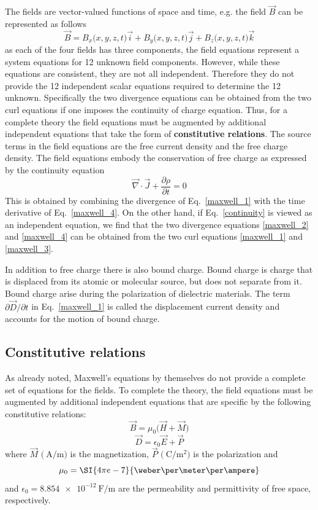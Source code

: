 \documentclass[12pt,a4paper,oneside]{book}
\begin{document}
\begin{onehalfspace}
The fields are vector-valued functions of space and time, e.g. the field $\vec{B}$ can be represented as follows $$ \vec{B} = B_x\big(x,y,z,t\big)\vec{i}+B_y\big(x,y,z,t\big)\vec{j}+B_z\big(x,y,z,t\big)\vec{k}$$ as each of the four fields has three components, the field equations represent a system equations for 12 unknown field components. However, while these equations are consistent, they are not all independent. Therefore they do not provide the 12 independent scalar equations required to determine the 12 unknown. Specifically the two divergence equations can be obtained from the two curl equations if one imposes the continuity of charge equation. Thus, for a complete theory the field equations must be augmented by additional independent equations that take the form of \textbf{constitutive relations}. The source terms in the field equations are the free current density and the free charge density. The field equations embody the conservation of free charge as expressed by the continuity equation
\begin{equation}\label{continuity}
	\vec{\nabla}\cdot\vec{J}+\frac{\partial \rho}{\partial t}=0
\end{equation}
This is obtained by combining the divergence of Eq.~\eqref{maxwell_1} with the time derivative of Eq.~\eqref{maxwell_4}. On the other hand, if Eq.~\eqref{continuity} is viewed as an independent equation, we find that the two divergence equations \ref{maxwell_2} and \ref{maxwell_4} can be obtained from the two curl equations \ref{maxwell_1} and \ref{maxwell_3}.

In addition to free charge there is also bound charge. Bound charge is charge that is displaced from its atomic or molecular source, but does not separate from it. Bound charge arise during the polarization of dielectric materials. The term $\partial\vec{D}/\partial t$ in Eq.~\eqref{maxwell_1} is called the displacement current density and accounts for the motion of bound charge.
\subsection{Constitutive relations}
As already noted, Maxwell's equations by themselves do not provide a complete set of equations for the fields. To complete the theory, the field equations must be augmented by additional independent equations that are specific by the following constitutive relations:
\begin{equation}\label{constitutive_1}
	\vec{B}=\mu_0\Big(\vec{H}+\vec{M}\Big)
\end{equation}
\begin{equation}\label{constitutive_2}
	\vec{D}=\epsilon_0\vec{E}+\vec{P}
\end{equation}
where $\vec{M}$ $\big(\SI{}{\ampere\per\meter}\big)$ is the magnetization, $\vec{P}$ $\big(\SI{}{\coulomb\per\square\meter}\big)$ is the polarization and $$\mu_0 = \SI{4\pi e-7}{\weber\per\meter\per\ampere}$$ and $\epsilon_0= \SI{8.854e-12}{\farad\per\meter}$ are the permeability and permittivity of free space, respectively.


\end{onehalfspace}
\end{document}
